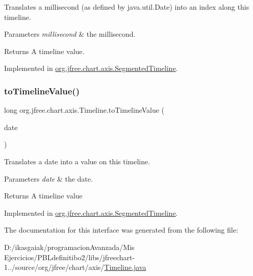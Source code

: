 Translates a millisecond (as defined by java.\+util.\+Date) into an index along this timeline.


\begin{DoxyParams}{Parameters}
{\em millisecond} & the millisecond.\\
\hline
\end{DoxyParams}
\begin{DoxyReturn}{Returns}
A timeline value. 
\end{DoxyReturn}


Implemented in \mbox{\hyperlink{classorg_1_1jfree_1_1chart_1_1axis_1_1_segmented_timeline_adade2f77808e594498067a2b70a6099e}{org.\+jfree.\+chart.\+axis.\+Segmented\+Timeline}}.

\mbox{\label{interfaceorg_1_1jfree_1_1chart_1_1axis_1_1_timeline_aadc67523764fdacdc35bd6aa816c87a7}} 
\subsubsection{\texorpdfstring{to\+Timeline\+Value()}{toTimelineValue()}\hspace{0.1cm}{\footnotesize\ttfamily [2/2]}}
{\footnotesize\ttfamily long org.\+jfree.\+chart.\+axis.\+Timeline.\+to\+Timeline\+Value (\begin{DoxyParamCaption}\item[{Date}]{date }\end{DoxyParamCaption})}

Translates a date into a value on this timeline.


\begin{DoxyParams}{Parameters}
{\em date} & the date.\\
\hline
\end{DoxyParams}
\begin{DoxyReturn}{Returns}
A timeline value 
\end{DoxyReturn}


Implemented in \mbox{\hyperlink{classorg_1_1jfree_1_1chart_1_1axis_1_1_segmented_timeline_a9ceca997773324de3d7164b023c1c0e0}{org.\+jfree.\+chart.\+axis.\+Segmented\+Timeline}}.



The documentation for this interface was generated from the following file\+:\begin{DoxyCompactItemize}
\item 
D\+:/ikasgaiak/programacion\+Avanzada/\+Mis Ejercicios/\+P\+B\+Ldefinitibo2/libs/jfreechart-\/1../source/org/jfree/chart/axis/\mbox{\hyperlink{_timeline_8java}{Timeline.\+java}}\end{DoxyCompactItemize}
